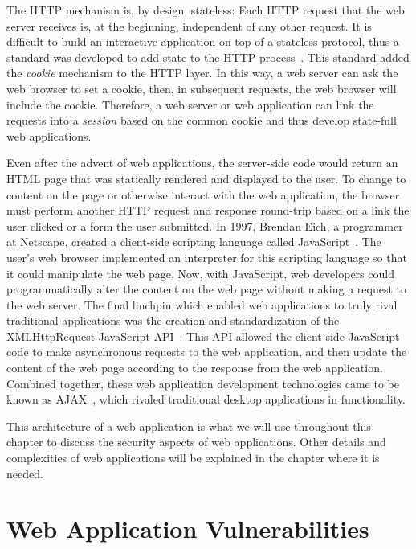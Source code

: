 The HTTP mechanism is, by design, stateless: Each HTTP request that
the web server receives is, at the beginning, independent of any other
request. It is difficult to build an interactive application on top of
a stateless protocol, thus a standard was developed to add state to
the HTTP process~\cite{kristol97:cookies}. This standard added the
\emph{cookie} mechanism to the HTTP layer. In this way, a web server
can ask the web browser to set a cookie, then, in subsequent requests,
the web browser will include the cookie. Therefore, a web server or
web application can link the requests into a \emph{session} based on
the common cookie and thus develop state-full web applications.

Even after the advent of web applications, the server-side code would
return an HTML page that was statically rendered and displayed to the
user. To change to content on the page or otherwise interact with the
web application, the browser must perform another HTTP request and
response round-trip based on a link the user clicked or a form the
user submitted. In 1997, Brendan Eich, a programmer at Netscape,
created a client-side scripting language called
JavaScript~\cite{ecmascript97}. The user's web browser implemented an
interpreter for this scripting language so that it could manipulate
the web page. Now, with JavaScript, web developers could
programmatically alter the content on the web page without making a
request to the web server. The final linchpin which enabled web
applications to truly rival traditional applications was the creation
and standardization of the XMLHttpRequest JavaScript
API~\cite{vankesteren06:xmlhttprequest}. This API allowed the
client-side JavaScript code to make asynchronous requests to the web
application, and then update the content of the web page according to
the response from the web application. Combined together, these web
application development technologies came to be known as
AJAX~\cite{garrett05:ajax}, which rivaled traditional desktop
applications in functionality. 

This architecture of a web application is what we will use throughout
this chapter to discuss the security aspects of web applications.
Other details and complexities of web applications will be explained
in the chapter where it is needed.

\section{Web Application Vulnerabilities}

